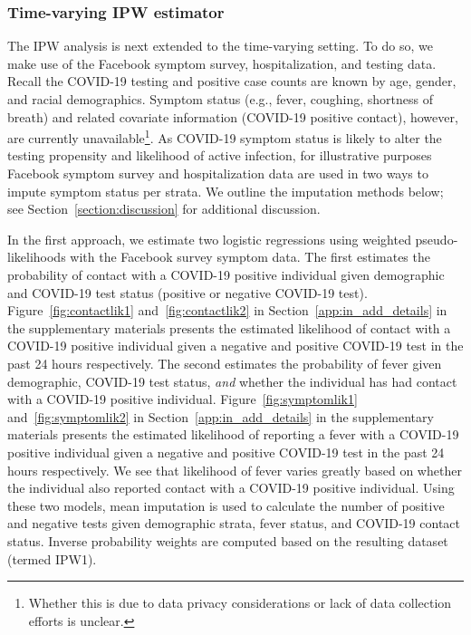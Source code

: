 \documentclass[11pt]{amsart}
\numberwithin{equation}{section}
\theoremstyle{plain}
\begin{document}
 \subsubsection{Time-varying IPW estimator}
 \label{section:tvipw}

 The IPW analysis is next extended to the time-varying setting.  To do so, we make use of the Facebook symptom survey, hospitalization, and testing data.  Recall the COVID-19 testing and positive case counts are known by age, gender, and racial demographics. Symptom status (e.g., fever, coughing, shortness of breath) and related covariate information (COVID-19 positive contact), however, are currently unavailable\footnote{Whether this is due to data privacy considerations or lack of data collection efforts is unclear.}.  As COVID-19 symptom status is likely to alter the testing propensity and likelihood of active infection, for illustrative purposes Facebook symptom survey and hospitalization data are used in two ways to impute symptom status per strata. We outline the imputation methods below; see Section~\ref{section:discussion} for additional discussion.

 In the first approach, we estimate two logistic regressions using weighted pseudo-likelihoods with the Facebook survey symptom data.  The first estimates the probability of contact with a COVID-19 positive individual given demographic and COVID-19 test status (positive or negative COVID-19 test). Figure~\ref{fig:contactlik1} and~\ref{fig:contactlik2} in Section~\ref{app:in_add_details} in the supplementary materials presents the estimated likelihood of contact with a COVID-19 positive individual given a negative and positive COVID-19 test in the past 24 hours respectively.  The second estimates the probability of fever given demographic, COVID-19 test status, \emph{and} whether the individual has had contact with a COVID-19 positive individual.  Figure~\ref{fig:symptomlik1} and~\ref{fig:symptomlik2} in Section~\ref{app:in_add_details} in the supplementary materials presents the estimated likelihood of reporting a fever with a COVID-19 positive individual given a negative and positive COVID-19 test in the past 24 hours respectively.  We see that likelihood of fever varies greatly based on whether the individual also reported contact with a COVID-19 positive individual. Using these two models, mean imputation is used to calculate the number of positive and negative tests given demographic strata, fever status, and COVID-19 contact status. Inverse probability weights are computed based on the resulting dataset (termed IPW1).
\end{document}
